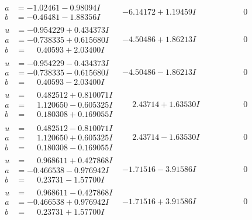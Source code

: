 \documentclass[1p]{elsarticle_modified}
\theoremstyle{definition}
\begin{document}
$$\begin{array}{c|c|c}
\begin{aligned}
a &= -1.02461 - 0.98094 I \\
b &= -0.46481 - 1.88356 I\end{aligned}
 & -6.14172 + 1.19459 I & \phantom{-0.000000 } 0 \\ \hline\begin{aligned}
u &= -0.954229 + 0.434373 I \\
a &= -0.738335 + 0.615680 I \\
b &= \phantom{-}0.40593 + 2.03400 I\end{aligned}
 & -4.50486 + 1.86213 I & \phantom{-0.000000 } 0 \\ \hline\begin{aligned}
u &= -0.954229 - 0.434373 I \\
a &= -0.738335 - 0.615680 I \\
b &= \phantom{-}0.40593 - 2.03400 I\end{aligned}
 & -4.50486 - 1.86213 I & \phantom{-0.000000 } 0 \\ \hline\begin{aligned}
u &= \phantom{-}0.482512 + 0.810071 I \\
a &= \phantom{-}1.120650 - 0.605325 I \\
b &= \phantom{-}0.180308 + 0.169055 I\end{aligned}
 & \phantom{-}2.43714 + 1.63530 I & \phantom{-0.000000 } 0 \\ \hline\begin{aligned}
u &= \phantom{-}0.482512 - 0.810071 I \\
a &= \phantom{-}1.120650 + 0.605325 I \\
b &= \phantom{-}0.180308 - 0.169055 I\end{aligned}
 & \phantom{-}2.43714 - 1.63530 I & \phantom{-0.000000 } 0 \\ \hline\begin{aligned}
u &= \phantom{-}0.968611 + 0.427868 I \\
a &= -0.466538 - 0.976942 I \\
b &= \phantom{-}0.23731 - 1.57700 I\end{aligned}
 & -1.71516 - 3.91586 I & \phantom{-0.000000 } 0 \\ \hline\begin{aligned}
u &= \phantom{-}0.968611 - 0.427868 I \\
a &= -0.466538 + 0.976942 I \\
b &= \phantom{-}0.23731 + 1.57700 I\end{aligned}
 & -1.71516 + 3.91586 I & \phantom{-0.000000 } 0\\

\end{array}$$
\end{document}
